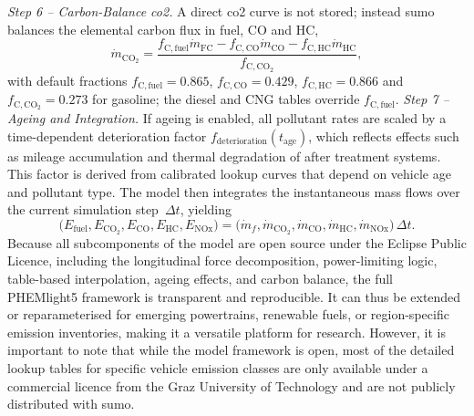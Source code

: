 \mynewline
\textit{Step 6 – Carbon-Balance \acs{co2}.}  
A direct \ac{co2} curve is not stored; instead \ac{sumo} balances the elemental carbon flux in fuel, CO and HC,
\[
  \boxed{\dot m_{\mathrm{CO_2}}
  =\frac{f_{\mathrm{C,fuel}}\dot m_{\mathrm{FC}}
        -f_{\mathrm{C,CO}}\dot m_{\mathrm{CO}}
        -f_{\mathrm{C,HC}}\dot m_{\mathrm{HC}}}
       {f_{\mathrm{C,CO_2}}}},
\]
with default fractions \(f_{\mathrm{C,fuel}}=0.865\), \(f_{\mathrm{C,CO}}=0.429\), \(f_{\mathrm{C,HC}}=0.866\) and \(f_{\mathrm{C,CO_2}}=0.273\) for gasoline; the diesel and CNG tables override \(f_{\mathrm{C,fuel}}\).
\mynewline
\textit{Step 7 – Ageing and Integration.}  
If ageing is enabled, all pollutant rates are scaled by a time-dependent deterioration factor \(f_{\mathrm{deterioration}}(t_{\mathrm{age}})\), which reflects effects such as mileage accumulation and thermal degradation of after treatment systems. This factor is derived from calibrated lookup curves that depend on vehicle age and pollutant type. The model then integrates the instantaneous mass flows over the current simulation step~\(\Delta t\), yielding
\[
  \bigl(E_{\mathrm{fuel}},E_{\mathrm{CO_2}},E_{\mathrm{CO}},
        E_{\mathrm{HC}},E_{\mathrm{NOx}}\bigr)
  =\bigl(\dot m_{f},\dot m_{\mathrm{CO_2}},\dot m_{\mathrm{CO}},
          \dot m_{\mathrm{HC}},\dot m_{\mathrm{NOx}}\bigr)\,\Delta t.
\]
\mynewline
Because all subcomponents of the model are open source under the Eclipse Public Licence, including the longitudinal force decomposition, power-limiting logic, table-based interpolation, ageing effects, and carbon balance, the full PHEMlight5 framework is transparent and reproducible. It can thus be extended or reparameterised for emerging powertrains, renewable fuels, or region-specific emission inventories, making it a versatile platform for research. However, it is important to note that while the model framework is open, most of the detailed lookup tables for specific vehicle emission classes are only available under a commercial licence from the Graz University of Technology and are not publicly distributed with \ac{sumo}.

